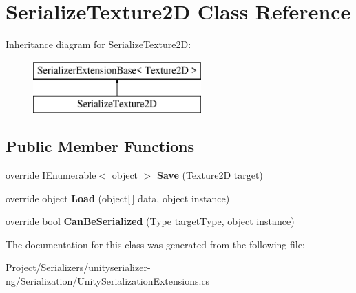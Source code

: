 \hypertarget{class_serialize_texture2_d}{}\section{Serialize\+Texture2D Class Reference}
\label{class_serialize_texture2_d}
Inheritance diagram for Serialize\+Texture2D\+:\begin{figure}[H]
\begin{center}
\leavevmode
\includegraphics[height=2.000000cm]{class_serialize_texture2_d}
\end{center}
\end{figure}
\subsection*{Public Member Functions}
\begin{DoxyCompactItemize}
\item 
\mbox{\label{class_serialize_texture2_d_aa2fd3c70876658476e1411bb13ac5966}} 
override I\+Enumerable$<$ object $>$ {\bfseries Save} (Texture2D target)
\item 
\mbox{\label{class_serialize_texture2_d_a769620049aa1f3f3f7ff17f6cacd74a1}} 
override object {\bfseries Load} (object\mbox{[}$\,$\mbox{]} data, object instance)
\item 
\mbox{\label{class_serialize_texture2_d_a4485a35955c52146f174efa44317787e}} 
override bool {\bfseries Can\+Be\+Serialized} (Type target\+Type, object instance)
\end{DoxyCompactItemize}


The documentation for this class was generated from the following file\+:\begin{DoxyCompactItemize}
\item 
Project/\+Serializers/unityserializer-\/ng/\+Serialization/Unity\+Serialization\+Extensions.\+cs\end{DoxyCompactItemize}
